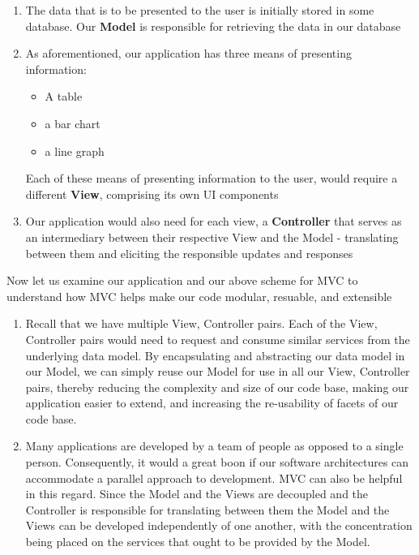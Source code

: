 \begin{enumerate}
\item The data that is to be presented to the user is initially stored in some database. Our \textbf{Model} is responsible for retrieving the data in our database

\item As aforementioned, our application has three means of presenting information:
    \begin{itemize}
    \item A table
    \item a bar chart
    \item a line graph
    \end{itemize}
    Each of these means of presenting information to the user, would require a different \textbf{View}, comprising  its own UI components
    
    
\item Our application would also need for each view, a \textbf{Controller} that serves as an intermediary between their respective View and the Model - translating between them and eliciting the responsible updates and responses
\end{enumerate}


Now let us examine our application and our above scheme for MVC to understand how MVC helps make our code modular, resuable, and extensible


\begin{enumerate}
\item Recall that we have multiple View, Controller pairs. Each of the View, Controller pairs would need to request and consume similar services from the underlying data model. By encapsulating and abstracting our data model in our Model, we can simply reuse our Model for use in all our View, Controller pairs, thereby reducing the complexity and size of our code base, making our application easier to extend, and increasing the re-usability of facets of our code base.

\item Many applications are developed by a team of people as opposed to a single person. Consequently, it would a great boon if our software architectures can accommodate a parallel approach to development. MVC can also be helpful in this regard. Since the Model and the Views are decoupled and the Controller is responsible for translating between them the Model and the Views can be developed independently of one another, with the concentration being placed on the services that ought to be provided by the Model.
\end{enumerate}







